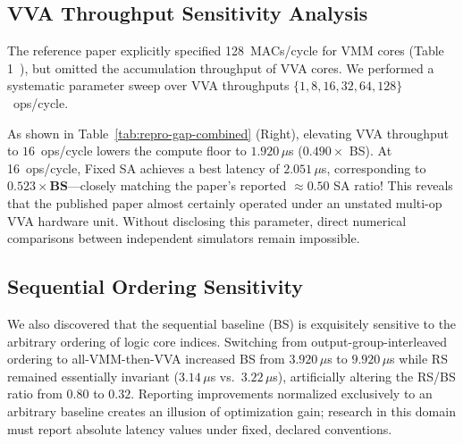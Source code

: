 \documentclass[10pt,conference]{IEEEtran}
\begin{document}
\subsection{VVA Throughput Sensitivity Analysis}
The reference paper explicitly specified 128~MACs/cycle for VMM cores (Table 1~\cite{wu2020todaes}), but omitted the accumulation throughput of VVA cores. We performed a systematic parameter sweep over VVA throughputs $\{1, 8, 16, 32, 64, 128\}$~ops/cycle.

As shown in Table~\ref{tab:repro-gap-combined} (Right), elevating VVA throughput to $16$~ops/cycle lowers the compute floor to $1.920\,\mu$s ($0.490 \times$ BS). At 16~ops/cycle, Fixed SA achieves a best latency of $2.051\,\mu$s, corresponding to $\mathbf{0.523 \times BS}$—closely matching the paper's reported ${\approx}0.50$ SA ratio! This reveals that the published paper almost certainly operated under an unstated multi-op VVA hardware unit. Without disclosing this parameter, direct numerical comparisons between independent simulators remain impossible.

\subsection{Sequential Ordering Sensitivity}
We also discovered that the sequential baseline (BS) is exquisitely sensitive to the arbitrary ordering of logic core indices. Switching from output-group-interleaved ordering to all-VMM-then-VVA increased BS from $3.920\,\mu$s to $9.920\,\mu$s while RS remained essentially invariant ($3.14\,\mu$s vs.\ $3.22\,\mu$s), artificially altering the RS/BS ratio from $0.80$ to $0.32$. Reporting improvements normalized exclusively to an arbitrary baseline creates an illusion of optimization gain; research in this domain must report absolute latency values under fixed, declared conventions.
\end{document}

